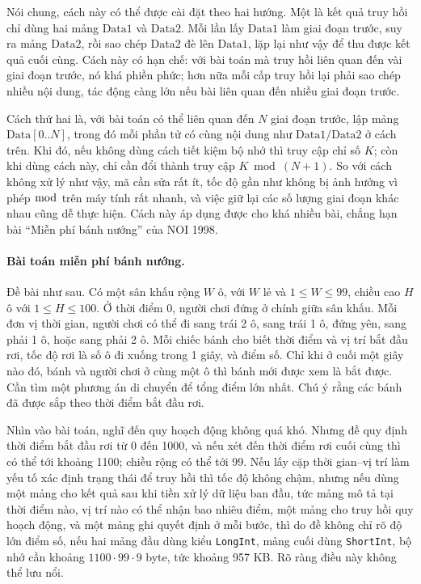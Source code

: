 \documentclass[11pt]{article}
\begin{document}
Nói chung, cách này có thể được cài đặt theo hai hướng. Một là kết quả truy
hồi chỉ dùng hai mảng \(\mathrm{Data1}\) và \(\mathrm{Data2}\). Mỗi lần lấy
\(\mathrm{Data1}\) làm giai đoạn trước, suy ra mảng \(\mathrm{Data2}\), rồi
sao chép \(\mathrm{Data2}\) đè lên \(\mathrm{Data1}\), lặp lại như vậy để thu
được kết quả cuối cùng. Cách này có hạn chế: với bài toán mà truy hồi liên
quan đến vài giai đoạn trước, nó khá phiền phức; hơn nữa mỗi cấp truy hồi lại
phải sao chép nhiều nội dung, tác động càng lớn nếu bài liên quan đến nhiều
giai đoạn trước.

Cách thứ hai là, với bài toán có thể liên quan đến \(N\) giai đoạn trước, lập
mảng \(\mathrm{Data}[0..N]\), trong đó mỗi phần tử có cùng nội dung như
\(\mathrm{Data1}/\mathrm{Data2}\) ở cách trên. Khi đó, nếu không dùng cách
tiết kiệm bộ nhớ thì truy cập chỉ số \(K\); còn khi dùng cách này, chỉ cần
đổi thành truy cập \(K\bmod (N+1)\). So với cách không xử lý như vậy, mã cần
sửa rất ít, tốc độ gần như không bị ảnh hưởng vì phép \(\bmod\) trên máy tính
rất nhanh, và việc giữ lại các số lượng giai đoạn khác nhau cũng dễ thực
hiện. Cách này áp dụng được cho khá nhiều bài, chẳng hạn bài ``Miễn phí bánh
nướng'' của NOI 1998.

\paragraph{Bài toán miễn phí bánh nướng.}
Đề bài như sau. Có một sân khấu rộng \(W\) ô, với \(W\) lẻ và
\(1\le W\le 99\), chiều cao \(H\) ô với \(1\le H\le 100\). Ở thời điểm 0,
người chơi đứng ở chính giữa sân khấu. Mỗi đơn vị thời gian, người chơi có
thể đi sang trái 2 ô, sang trái 1 ô, đứng yên, sang phải 1 ô, hoặc sang phải
2 ô. Mỗi chiếc bánh cho biết thời điểm và vị trí bắt đầu rơi, tốc độ rơi là
số ô đi xuống trong 1 giây, và điểm số. Chỉ khi ở cuối một giây nào đó, bánh
và người chơi ở cùng một ô thì bánh mới được xem là bắt được. Cần tìm một
phương án di chuyển để tổng điểm lớn nhất. Chú ý rằng các bánh đã được sắp
theo thời điểm bắt đầu rơi.

Nhìn vào bài toán, nghĩ đến quy hoạch động không quá khó. Nhưng đề quy định
thời điểm bắt đầu rơi từ 0 đến 1000, và nếu xét đến thời điểm rơi cuối cùng
thì có thể tới khoảng 1100; chiều rộng có thể tới 99. Nếu lấy cặp thời
gian--vị trí làm yếu tố xác định trạng thái để truy hồi thì tốc độ không chậm,
nhưng nếu dùng một mảng cho kết quả sau khi tiền xử lý dữ liệu ban đầu, tức
mảng mô tả tại thời điểm nào, vị trí nào có thể nhận bao nhiêu điểm, một mảng
cho truy hồi quy hoạch động, và một mảng ghi quyết định ở mỗi bước, thì do đề
không chỉ rõ độ lớn điểm số, nếu hai mảng đầu dùng kiểu \texttt{LongInt}, mảng
cuối dùng \texttt{ShortInt}, bộ nhớ cần khoảng \(1100\cdot99\cdot9\) byte,
tức khoảng 957 KB. Rõ ràng điều này không thể lưu nổi.
\end{document}
